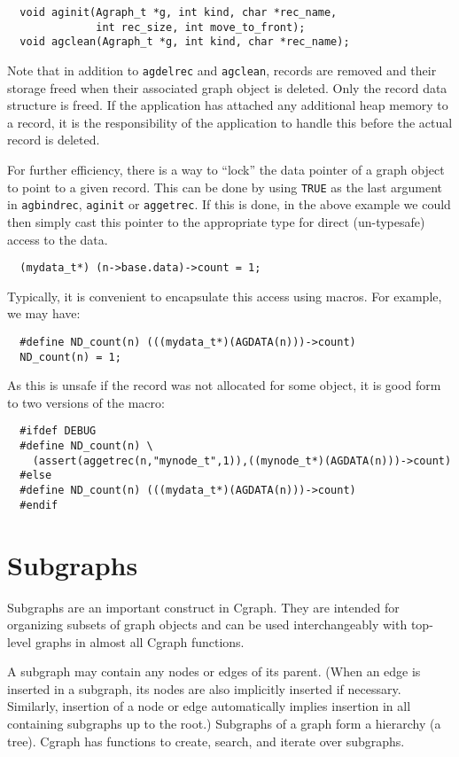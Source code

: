 \documentclass[11pt,letterpaper]{article}
\begin{document}
\begin{verbatim}
  void aginit(Agraph_t *g, int kind, char *rec_name,
              int rec_size, int move_to_front);
  void agclean(Agraph_t *g, int kind, char *rec_name);
\end{verbatim}

Note that in addition to \verb"agdelrec" and \verb"agclean", records are removed
and their storage freed when their associated graph object is deleted. Only the
record data structure is freed. If the application has attached any additional heap
memory to a record, it is the responsibility of the application to handle this before
the actual record is deleted.

For further efficiency, there is a way to ``lock'' the data pointer of
a graph object to point to a given record.  This can be done by using \verb"TRUE"
as the last argument in \verb"agbindrec", \verb"aginit" or \verb"aggetrec".
If this is done, in the above example
we could then simply cast this pointer to the appropriate type
for direct (un-typesafe) access to the data.

\begin{verbatim}
  (mydata_t*) (n->base.data)->count = 1;
\end{verbatim}

Typically, it is convenient to encapsulate this access using macros. For example,
we may have:
\begin{verbatim}
  #define ND_count(n) (((mydata_t*)(AGDATA(n)))->count)
  ND_count(n) = 1;
\end{verbatim}

As this is unsafe if the record was not allocated for some object, it is good form
to two versions of the macro:
\begin{verbatim}
  #ifdef DEBUG
  #define ND_count(n) \
    (assert(aggetrec(n,"mynode_t",1)),((mynode_t*)(AGDATA(n)))->count)
  #else
  #define ND_count(n) (((mydata_t*)(AGDATA(n)))->count)
  #endif
\end{verbatim}

\section{Subgraphs}
\label{sec:subgraphs}
Subgraphs are an important construct in Cgraph.  They are intended for
organizing subsets of graph objects and can be used interchangeably with
top-level graphs in almost all Cgraph functions.

A subgraph may contain any nodes or edges of its parent.
(When an edge is inserted in a subgraph, its nodes
are also implicitly inserted if necessary.  Similarly,
insertion of a node or edge automatically implies
insertion in all containing subgraphs up to the root.)
Subgraphs of a graph form a hierarchy (a tree).
Cgraph has functions to create, search, and iterate over subgraphs.
\end{document}
